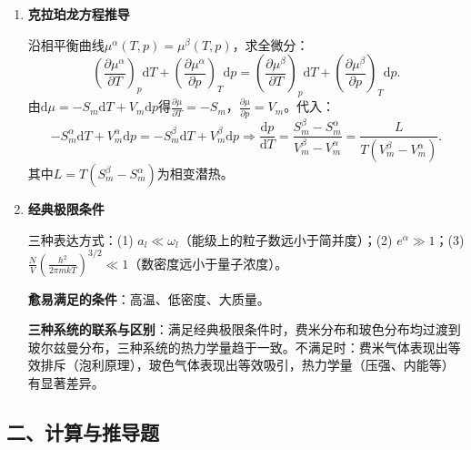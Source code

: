\documentclass[12pt,a4paper,fontset=mac]{ctexart}
\newcommand{\dd}{\mathrm{d}}
\newcommand{\đ}{\mathrm{đ}}
\begin{document}
\begin{enumerate}
\item \textbf{克拉珀龙方程推导}

沿相平衡曲线$\mu^\alpha(T,p)=\mu^\beta(T,p)$，求全微分：
\[\left(\frac{\partial\mu^\alpha}{\partial T}\right)_p\dd T+\left(\frac{\partial\mu^\alpha}{\partial p}\right)_T\dd p=\left(\frac{\partial\mu^\beta}{\partial T}\right)_p\dd T+\left(\frac{\partial\mu^\beta}{\partial p}\right)_T\dd p.\]
由$\dd\mu=-S_m\dd T+V_m\dd p$得$\frac{\partial\mu}{\partial T}=-S_m$，$\frac{\partial\mu}{\partial p}=V_m$。代入：
\[-S_m^\alpha\dd T+V_m^\alpha\dd p=-S_m^\beta\dd T+V_m^\beta\dd p\Rightarrow\frac{\dd p}{\dd T}=\frac{S_m^\beta-S_m^\alpha}{V_m^\beta-V_m^\alpha}=\frac{L}{T(V_m^\beta-V_m^\alpha)}.\]
其中$L=T(S_m^\beta-S_m^\alpha)$为相变潜热。

\item \textbf{经典极限条件}

三种表达方式：(1) $a_l\ll\omega_l$（能级上的粒子数远小于简并度）；(2) $e^\alpha\gg1$；(3) $\frac{N}{V}(\frac{h^2}{2\pi mkT})^{3/2}\ll1$（数密度远小于量子浓度）。

\textbf{愈易满足的条件}：高温、低密度、大质量。

\textbf{三种系统的联系与区别}：满足经典极限条件时，费米分布和玻色分布均过渡到玻尔兹曼分布，三种系统的热力学量趋于一致。不满足时：费米气体表现出等效排斥（泡利原理），玻色气体表现出等效吸引，热力学量（压强、内能等）有显著差异。

\end{enumerate}

\newpage

\subsection*{二、计算与推导题}
\end{document}
